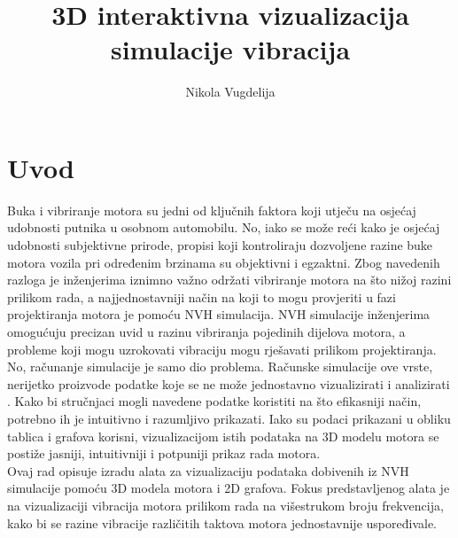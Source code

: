 \documentclass[times, utf8, diplomski]{fer}
\begin{document}

\title{3D interaktivna vizualizacija simulacije vibracija}

\author{Nikola Vugdelija}

\maketitle





\tableofcontents

\listoffigures

\chapter{Uvod}
Buka i vibriranje motora su jedni od ključnih faktora koji utječu na osjećaj udobnosti putnika u osobnom automobilu. No, iako se može reći kako je osjećaj udobnosti subjektivne prirode, propisi koji kontroliraju dozvoljene razine buke motora vozila pri određenim brzinama su objektivni i egzaktni. Zbog navedenih razloga je inženjerima iznimno važno održati vibriranje motora na što nižoj razini prilikom rada, a najjednostavniji način na koji to mogu provjeriti u fazi projektiranja motora je pomoću NVH  simulacija. NVH simulacije inženjerima omogućuju precizan uvid u razinu vibriranja pojedinih dijelova motora, a probleme koji mogu uzrokovati vibraciju mogu rješavati prilikom projektiranja.\\

No, računanje simulacije je samo dio problema. Računske simulacije ove vrste, nerijetko proizvode podatke koje se ne može jednostavno vizualizirati i analizirati \citep{matkovic2021getting}. Kako bi stručnjaci mogli navedene podatke koristiti na što efikasniji način, potrebno ih je intuitivno i razumljivo prikazati. Iako su podaci prikazani u obliku tablica i grafova korisni, vizualizacijom istih podataka na 3D modelu motora se postiže jasniji, intuitivniji i potpuniji prikaz rada motora.\\

Ovaj rad opisuje izradu alata za vizualizaciju podataka dobivenih iz NVH simulacije pomoću 3D modela motora i 2D grafova. Fokus predstavljenog alata je na vizualizaciji vibracija motora prilikom rada na višestrukom broju frekvencija, kako bi se razine vibracije različitih taktova motora jednostavnije uspoređivale.
\end{document}
